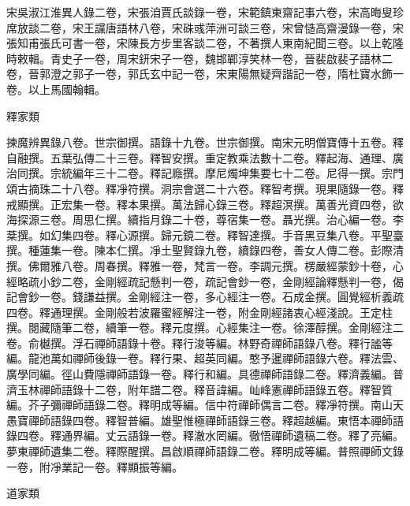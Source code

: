 \begin{pinyinscope}
宋吳淑江淮異人錄二卷，宋張洎賈氏談錄一卷，宋範鎮東齋記事六卷，宋高晦叟珍席放談二卷，宋王讜唐語林八卷，宋硃彧萍洲可談三卷，宋曾慥高齋漫錄一卷，宋張知甫張氏可書一卷，宋陳長方步里客談二卷，不著撰人東南紀聞三卷。以上乾隆時敕輯。青史子一卷，周宋鈃宋子一卷，魏邯鄲淳笑林一卷，晉裴啟裴子語林二卷，晉郭澄之郭子一卷，郭氏玄中記一卷，宋東陽無疑齊諧記一卷，隋杜寶水飾一卷。以上馬國翰輯。

釋家類

揀魔辨異錄八卷。世宗御撰。語錄十九卷。世宗御撰。南宋元明僧寶傳十五卷。釋自融撰。五葉弘傳二十三卷。釋智安撰。重定教乘法數十二卷。釋起海、通理、廣治同撰。宗統編年三十二卷。釋記廕撰。摩尼燭坤集要七十二卷。尼得一撰。宗門頌古摘珠二十八卷。釋凈符撰。洞宗會選二十六卷。釋智考撰。現果隨錄一卷。釋戒顯撰。正宏集一卷。釋本果撰。萬法歸心錄三卷。釋超溟撰。萬善光資四卷，欲海探源三卷。周思仁撰。續指月錄二十卷，尊宿集一卷。聶光撰。治心編一卷。李棻撰。如幻集四卷。釋心源撰。歸元鏡二卷。釋智達撰。手音黑豆集八卷。平聖臺撰。種蓮集一卷。陳本仁撰。凈土聖賢錄九卷，續錄四卷，善女人傳二卷。彭際清撰。佛爾雅八卷。周春撰。釋雅一卷，梵言一卷。李調元撰。楞嚴經蒙鈔十卷，心經略疏小鈔二卷，金剛經疏記懸判一卷，疏記會鈔一卷，金剛經論釋懸判一卷，偈記會鈔一卷。錢謙益撰。金剛經注一卷，多心經注一卷。石成金撰。圓覺經析義疏四卷。釋通理撰。金剛般若波羅蜜經解注一卷，附金剛經諸衷心經淺說。王定柱撰。閱藏隨筆二卷，續筆一卷。釋元度撰。心經集注一卷。徐澤醇撰。金剛經注二卷。俞樾撰。浮石禪師語錄十卷。釋行浚等編。林野奇禪師語錄八卷。釋行謐等編。龍池萬如禪師後錄一卷。釋行果、超英同編。憨予暹禪師語錄六卷。釋法雲、廣學同編。徑山費隱禪師語錄一卷。釋行和編。具德禪師語錄二卷。釋濟義編。普濟玉林禪師語錄十二卷，附年譜二卷。釋音諱編。屾峰憲禪師語錄五卷。釋智質編。芥子彌禪師語錄二卷。釋明成等編。信中符禪師偶言二卷。釋凈符撰。南山天愚寶禪師語錄四卷。釋智普編。雄聖惟極禪師語錄三卷。釋超越編。東悟本禪師語錄四卷。釋通界編。丈云語錄一卷。釋澈水罔編。徹悟禪師遺稿二卷。釋了亮編。夢東禪師遺集二卷。釋際醒撰。昌啟順禪師語錄二卷。釋明成等編。普照禪師文錄一卷，附凈業記一卷。釋顯振等編。

道家類


\end{pinyinscope}
